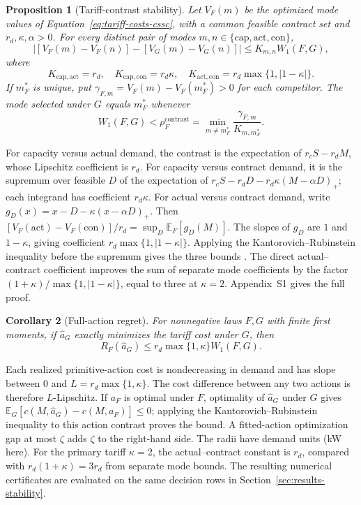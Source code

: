 \documentclass[suppldata]{interact}
\newtheorem{proposition}{Proposition}[section]
\newtheorem{corollary}[proposition]{Corollary}
\begin{document}
\begin{proposition}[Tariff-contrast stability]
\label{prop:contrast-wasserstein-cssc}
Let $V_F(m)$ be the optimized mode values of
Equation~\eqref{eq:tariff-costs-cssc}, with a common feasible contract
set and $r_d,\kappa,\alpha>0$. For every distinct pair of modes
$m,n\in\{\mathrm{cap},\mathrm{act},\mathrm{con}\}$,
\[
|[V_F(m)-V_F(n)]-[V_G(m)-V_G(n)]|
\leq K_{m,n}W_1(F,G),
\]
where
\begin{equation}
\label{eq:contrast-constants-cssc}
K_{\mathrm{cap},\mathrm{act}}=r_d,\quad
K_{\mathrm{cap},\mathrm{con}}=r_d\kappa,\quad
K_{\mathrm{act},\mathrm{con}}
=r_d\max\{1,|1-\kappa|\}.
\end{equation}
If $m_F^*$ is unique, put
$\gamma_{F,m}=V_F(m)-V_F(m_F^*)>0$ for each competitor.
The mode selected under $G$ equals $m_F^*$ whenever
\begin{equation}
\label{eq:contrast-radius-cssc}
W_1(F,G)<\rho_F^{\mathrm{contrast}}
=\min_{m\ne m_F^*}\frac{\gamma_{F,m}}{K_{m,m_F^*}}.
\end{equation}
\end{proposition}
For capacity versus actual demand, the contrast is the expectation
of $r_cS-r_dM$, whose Lipschitz coefficient is $r_d$.
For capacity versus contract demand, it is the supremum over feasible
$D$ of the expectation of
$r_cS-r_dD-r_d\kappa(M-\alpha D)_+$; each integrand has coefficient
$r_d\kappa$. For actual versus contract demand, write
$g_D(x)=x-D-\kappa(x-\alpha D)_+$.
Then $[V_F(\mathrm{act})-V_F(\mathrm{con})]/r_d
=\sup_D\mathbb E_F[g_D(M)]$. The slopes of $g_D$ are $1$ and
$1-\kappa$, giving coefficient
$r_d\max\{1,|1-\kappa|\}$. Applying the
Kantorovich--Rubinstein inequality before the supremum gives the
three bounds \citep{RachevRomisch2002}. The direct actual--contract
coefficient improves the sum of separate mode coefficients by the
factor $(1+\kappa)/\max\{1,|1-\kappa|\}$, equal to three at
$\kappa=2$. Appendix~S1 gives the full proof.

\begin{corollary}[Full-action regret]
For nonnegative laws $F,G$ with finite first moments, if
$\widehat a_G$ exactly minimizes the tariff cost under $G$, then
\[
R_F(\widehat a_G)\leq r_d\max\{1,\kappa\}W_1(F,G).
\]
\end{corollary}
Each realized primitive-action cost is nondecreasing in demand and
has slope between $0$ and $L=r_d\max\{1,\kappa\}$. The cost difference
between any two actions is therefore $L$-Lipschitz. If $a_F$ is
optimal under $F$, optimality of $\widehat a_G$ under $G$ gives
$\mathbb E_G[c(M,\widehat a_G)-c(M,a_F)]\leq0$; applying the
Kantorovich--Rubinstein inequality to this action contrast proves
the bound. A fitted-action optimization gap at most $\zeta$ adds
$\zeta$ to the right-hand side.
The radii have demand units (kW here). For the primary tariff
$\kappa=2$, the actual--contract constant is $r_d$, compared with
$r_d(1+\kappa)=3r_d$ from separate mode bounds. The resulting
numerical certificates are evaluated on the same decision rows in
Section~\ref{sec:results-stability}.
\end{document}

